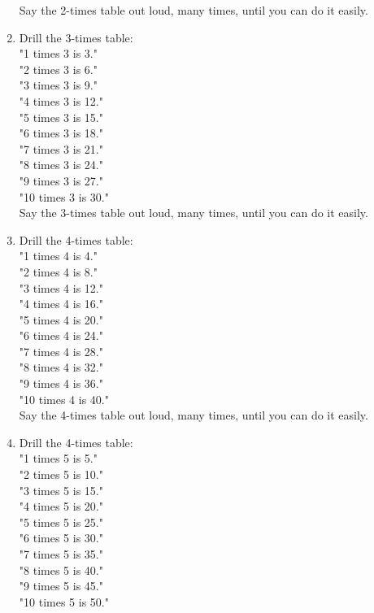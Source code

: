 \documentclass[12pt]{article}
\begin{document}
\begin{enumerate}
Say the 2-times table out loud, many times, until you can do it easily.\\

\item Drill the 3-times table:\\

"1 times 3 is 3."\\
"2 times 3 is 6."\\
"3 times 3 is 9."\\
"4 times 3 is 12."\\
"5 times 3 is 15."\\
"6 times 3 is 18."\\
"7 times 3 is 21."\\
"8 times 3 is 24."\\
"9 times 3 is 27."\\
"10 times 3 is 30."\\

Say the 3-times table out loud, many times, until you can do it easily.\\

\item Drill the 4-times table:\\

"1 times 4 is 4."\\
"2 times 4 is 8."\\
"3 times 4 is 12."\\
"4 times 4 is 16."\\
"5 times 4 is 20."\\
"6 times 4 is 24."\\
"7 times 4 is 28."\\
"8 times 4 is 32."\\
"9 times 4 is 36."\\
"10 times 4 is 40."\\

Say the 4-times table out loud, many times, until you can do it easily.\\

\item Drill the 4-times table:\\

"1 times 5 is 5."\\
"2 times 5 is 10."\\
"3 times 5 is 15."\\
"4 times 5 is 20."\\
"5 times 5 is 25."\\
"6 times 5 is 30."\\
"7 times 5 is 35."\\
"8 times 5 is 40."\\
"9 times 5 is 45."\\
"10 times 5 is 50."\\


\end{enumerate}
\end{document}
